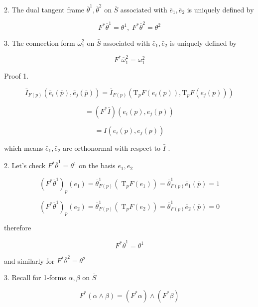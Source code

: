 \documentclass[lang=cn,a4paper,11pt,openany,twoside]{elegantbook}
\begin{document}
2. The dual tangent frame \({\overline{\theta }}^{1},{\overline{\theta }}^{2}\) on \(\bar{S}\) associated with \({\bar{e}}_{1},{\bar{e}}_{2}\) is uniquely defined by

\[
{F}^{ * }{\overline{\theta }}^{1} = {\theta }^{1},\;{F}^{ * }{\overline{\theta }}^{2} = {\theta }^{2}
\]

3. The connection form \({\overline{\omega }}_{1}^{2}\) on \(\bar{S}\) associated with \({\bar{e}}_{1},{\bar{e}}_{2}\) is uniquely defined by

\[
{F}^{ * }{\overline{\omega }}_{1}^{2} = {\omega }_{1}^{2}
\]

Proof 1.

\[
{\bar{I}}_{F\left( p\right) }\left( {{\bar{e}}_{i}\left( \bar{p}\right) ,{\bar{e}}_{j}\left( \bar{p}\right) }\right)  = {\bar{I}}_{F\left( p\right) }\left( {{\mathrm{T}}_{p}F\left( {{e}_{i}\left( p\right) }\right) ,{\mathrm{T}}_{p}F\left( {{e}_{j}\left( p\right) }\right) }\right)
\]

\[
= \left( {{F}^{ * }\bar{I}}\right) \left( {{e}_{i}\left( p\right) ,{e}_{j}\left( p\right) }\right)
\]

\[
= I\left( {{e}_{i}\left( p\right) ,{e}_{j}\left( p\right) }\right)
\]

which means \({\bar{e}}_{1},{\bar{e}}_{2}\) are orthonormal with respect to \(\bar{I}\) .

2. Let’s check \({F}^{ * }{\overline{\theta }}^{1} = {\theta }^{1}\) on the basis \({e}_{1},{e}_{2}\)

\[
{\left( {F}^{ * }{\overline{\theta }}^{1}\right) }_{p}\left( {e}_{1}\right)  = {\overline{\theta }}_{F\left( p\right) }^{1}\left( {{\mathrm{\;T}}_{p}F\left( {e}_{1}\right) }\right)  = {\overline{\theta }}_{F\left( p\right) }^{1}{\bar{e}}_{1}\left( \bar{p}\right)  = 1
\]

\[
{\left( {F}^{ * }{\overline{\theta }}^{1}\right) }_{p}\left( {e}_{2}\right)  = {\overline{\theta }}_{F\left( p\right) }^{1}\left( {{\mathrm{\;T}}_{p}F\left( {e}_{2}\right) }\right)  = {\overline{\theta }}_{F\left( p\right) }^{1}{\bar{e}}_{2}\left( \bar{p}\right)  = 0
\]

therefore

\[
{F}^{ * }{\overline{\theta }}^{1} = {\theta }^{1}
\]

and similarly for \({F}^{ * }{\overline{\theta }}^{2} = {\theta }^{2}\)

3. Recall for 1-forms \(\alpha ,\beta\) on \(\bar{S}\)

\[
{F}^{ * }\left( {\alpha  \land  \beta }\right)  = \left( {{F}^{ * }\alpha }\right)  \land  \left( {{F}^{ * }\beta }\right)
\]
\end{document}
